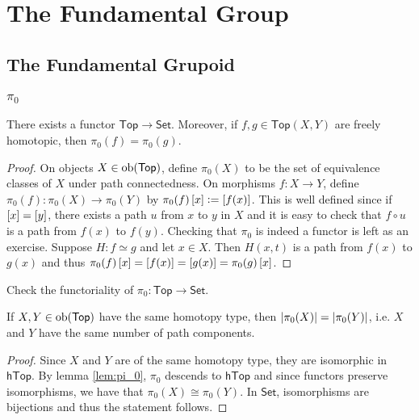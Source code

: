 \chapter{The Fundamental Group}
\section*{The Fundamental Grupoid}
\subsection*{$\pi_0$}

\begin{lemma}
	There exists a functor $\mathsf{Top} \to \mathsf{Set}$. Moreover, if $f,g \in \mathsf{Top}(X,Y)$ are freely homotopic, then $\pi_0(f) = \pi_0(g)$.
	\label{lem:pi_0}
\end{lemma}

\begin{proof}
	On objects $X \in \operatorname{ob}(\mathsf{Top})$, define $\pi_0(X)$ to be the set of equivalence classes of $X$ under path connectedness. On morphisms $f : X \to Y$, define $\pi_0(f) : \pi_0(X) \to \pi_0(Y)$ by $\pi_0(f)\sbr{x} := \sbr[0]{f(x)}$. This is well defined since if $\sbr{x} = \sbr[0]{y}$, there exists a path $u$ from $x$ to $y$ in $X$ and it is easy to check that $f \circ u$ is a path from $f(x)$ to $f(y)$. Checking that $\pi_0$ is indeed a functor is left as an exercise. Suppose $H : f \simeq g$ and let $x \in X$. Then $H(x,t)$ is a path from $f(x)$ to $g(x)$ and thus $\pi_0(f)\sbr{x} = \sbr[0]{f(x)} = \sbr[0]{g(x)} = \pi_0(g)\sbr{x}$.
\end{proof}

\begin{exercise}
	Check the functoriality of $\pi_0 : \mathsf{Top} \to \mathsf{Set}$.
\end{exercise}

\begin{proposition}
	If $X,Y \in \operatorname{ob}(\mathsf{Top})$ have the same homotopy type, then $\abs[0]{\pi_0(X)} = \abs[0]{\pi_0(Y)}$, i.e. $X$ and $Y$ have the same number of path components.
\end{proposition}

\begin{proof}
	Since $X$ and $Y$ are of the same homotopy type, they are isomorphic in $\mathsf{hTop}$. By lemma \ref{lem:pi_0}, $\pi_0$ descends to $\mathsf{hTop}$ and since functors preserve isomorphisms, we have that $\pi_0(X) \cong \pi_0(Y)$. In $\mathsf{Set}$, isomorphisms are bijections and thus the statement follows.
\end{proof}

